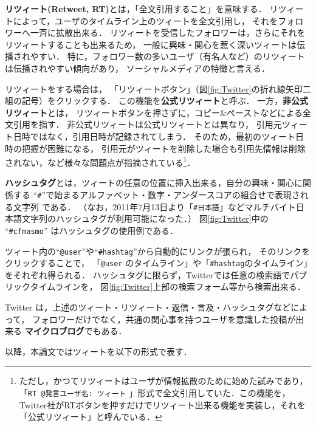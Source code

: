 \documentclass[japanese]{jnlp_1.4}
\newcommand{\twitter}[3]{}
\begin{document}
{\bf リツィート(Retweet, RT)}とは，「全文引用すること」を意味する．
リツィートによって，ユーザのタイムライン上のツィートを全文引用し，
それをフォロワーへ一斉に拡散出来る．
リツィートを受信したフォロワーは，さらにそれをリツィートすることも出来るため，
一般に興味・関心を惹く深いツィートは伝播されやすい．
特に，フォロワー数の多いユーザ（有名人など）のリツィートは伝播されやすい傾向があり，
ソーシャルメディアの特徴と言える．

リツィートをする場合は，
「リツィートボタン」（図\ref{fig:Twitter}の折れ線矢印二組の記号）をクリックする．
この機能を{\bf 公式リツィート}と呼ぶ．
一方，{\bf 非公式リツィート}とは，
リツィートボタンを押さずに，コピー\&ペーストなどによる全文引用を指す．
非公式リツィートは公式リツィートとは異なり，
引用元ツィート日時ではなく，引用日時が記録されてしまう．
そのため，最初のツィート日時の把握が困難になる，
引用元がツィートを削除した場合も引用先情報は削除されない，など様々な問題点が指摘されている\footnote{ただし，かつてリツィートはユーザが情報拡散のために始めた試みであり，「{\tt RT @発言ユーザ名: ツィート} 」形式で全文引用していた．この機能を，Twitter社がRTボタンを押すだけでリツィート出来る機能を実装し，それを「公式リツィート」と呼んでいる．}．

{\bf ハッシュタグ}とは，ツィートの任意の位置に挿入出来る，自分の興味・関心に関係する
``{\tt \#}''で始まるアルファベット・数字・アンダースコアの組合せで表現される文字列
である．
（なお，2011年7月13日より「{\tt \#日本語}」などマルチバイト日本語文字列のハッシュタグが利用可能になった\cite{nihongo}．）
図\ref{fig:Twitter}中の ``{\tt \#cfmasmo}'' はハッシュタグの使用例である．

ツィート内の``{\tt @user}''や``{\tt \#hashtag}''から自動的にリンクが張られ，
そのリンクをクリックすることで，
「{\tt @user} のタイムライン」や「{\tt \#hashtag}のタイムライン」をそれぞれ得られる．
ハッシュタグに限らず，Twitterでは任意の検索語でパブリックタイムラインを，
図\ref{fig:Twitter}上部の検索フォーム等から検索出来る．

Twitter は，上述のツィート・リツィート・返信・言及・ハッシュタグなどによって，
フォロワーだけでなく，共通の関心事を持つユーザを意識した投稿が出来る {\bf マイクロブログ}でもある．

以降，本論文ではツィートを以下の形式で表す．
\begin{quote}
 \twitter{@user2 user2 user3 への言及ツィート \#tag${}_1$ ... \#tag${}_n$ \\ RT @user3: user3 のツィートの部分引用 ...}{YYYY/MM/DD hh:mm:ss}{user1}
\end{quote}
\end{document}
